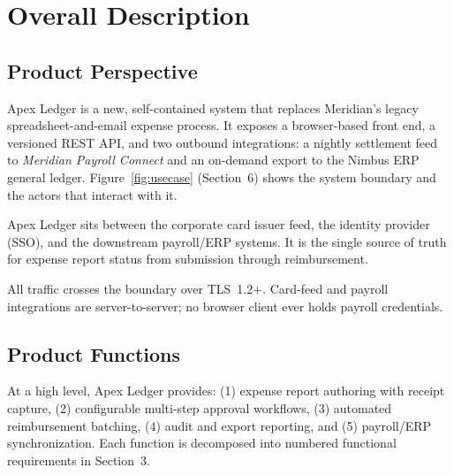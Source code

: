 \section{Overall Description}

\subsection{Product Perspective}
Apex Ledger is a new, self-contained system that replaces Meridian's legacy
spreadsheet-and-email expense process. It exposes a browser-based front end, a versioned REST
API, and two outbound integrations: a nightly settlement feed to \textit{Meridian Payroll
Connect} and an on-demand export to the Nimbus ERP general ledger. Figure~\ref{fig:usecase}
(Section~6) shows the system boundary and the actors that interact with it.

\begin{center}
\begin{minipage}{0.46\textwidth}
\begin{tcolorbox}[colback=white,colframe=steelblue,boxrule=0.7pt,arc=2pt,title={\faFile\ System Context},fonttitle=\bfseries\color{white},colbacktitle=steelblue]
\footnotesize
Apex Ledger sits between the corporate card issuer feed, the identity provider (SSO), and the
downstream payroll/ERP systems. It is the single source of truth for expense report status
from submission through reimbursement.
\end{tcolorbox}
\end{minipage}\hfill
\begin{minipage}{0.46\textwidth}
\begin{tcolorbox}[colback=white,colframe=steelblue,boxrule=0.7pt,arc=2pt,title={\faLock\ Trust Boundary},fonttitle=\bfseries\color{white},colbacktitle=steelblue]
\footnotesize
All traffic crosses the boundary over TLS~1.2+. Card-feed and payroll integrations are
server-to-server; no browser client ever holds payroll credentials.
\end{tcolorbox}
\end{minipage}
\end{center}
\par

\subsection{Product Functions}
At a high level, Apex Ledger provides: (1) expense report authoring with receipt capture,
(2) configurable multi-step approval workflows, (3) automated reimbursement batching,
(4) audit and export reporting, and (5) payroll/ERP synchronization. Each function is
decomposed into numbered functional requirements in Section~3.

